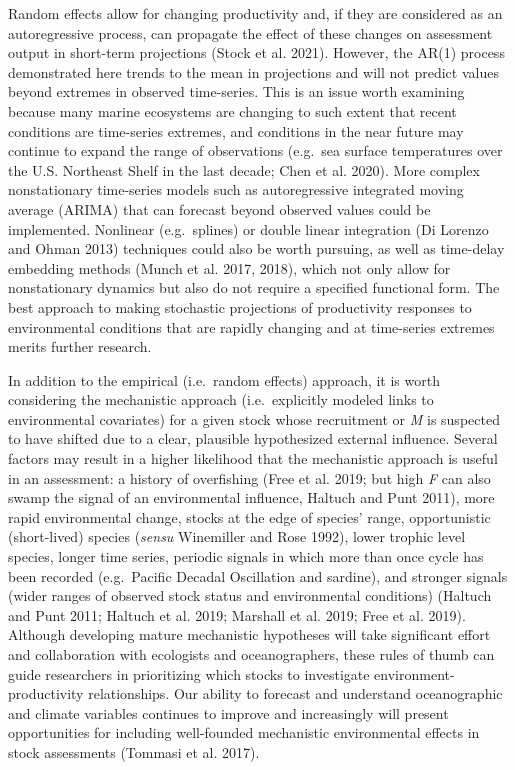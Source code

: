 \documentclass[]{article}
\begin{document}
Random effects allow for changing productivity and, if they are
considered as an autoregressive process, can propagate the effect of
these changes on assessment output in short-term projections (Stock et
al. 2021). However, the AR(1) process demonstrated here trends to the
mean in projections and will not predict values beyond extremes in
observed time-series. This is an issue worth examining because many
marine ecosystems are changing to such extent that recent conditions are
time-series extremes, and conditions in the near future may continue to
expand the range of observations (e.g.~sea surface temperatures over the
U.S. Northeast Shelf in the last decade; Chen et al. 2020). More complex
nonstationary time-series models such as autoregressive integrated
moving average (ARIMA) that can forecast beyond observed values could be
implemented. Nonlinear (e.g.~splines) or double linear integration (Di
Lorenzo and Ohman 2013) techniques could also be worth pursuing, as well
as time-delay embedding methods (Munch et al. 2017, 2018), which not
only allow for nonstationary dynamics but also do not require a
specified functional form. The best approach to making stochastic
projections of productivity responses to environmental conditions that
are rapidly changing and at time-series extremes merits further
research.

In addition to the empirical (i.e.~random effects) approach, it is worth
considering the mechanistic approach (i.e.~explicitly modeled links to
environmental covariates) for a given stock whose recruitment or
\emph{M} is suspected to have shifted due to a clear, plausible
hypothesized external influence. Several factors may result in a higher
likelihood that the mechanistic approach is useful in an assessment: a
history of overfishing (Free et al. 2019; but high \emph{F} can also
swamp the signal of an environmental influence, Haltuch and Punt 2011),
more rapid environmental change, stocks at the edge of species' range,
opportunistic (short-lived) species (\emph{sensu} Winemiller and Rose
1992), lower trophic level species, longer time series, periodic signals
in which more than once cycle has been recorded (e.g.~Pacific Decadal
Oscillation and sardine), and stronger signals (wider ranges of observed
stock status and environmental conditions) (Haltuch and Punt 2011;
Haltuch et al. 2019; Marshall et al. 2019; Free et al. 2019). Although
developing mature mechanistic hypotheses will take significant effort
and collaboration with ecologists and oceanographers, these rules of
thumb can guide researchers in prioritizing which stocks to investigate
environment-productivity relationships. Our ability to forecast and
understand oceanographic and climate variables continues to improve and
increasingly will present opportunities for including well-founded
mechanistic environmental effects in stock assessments (Tommasi et al.
2017).
\end{document}
